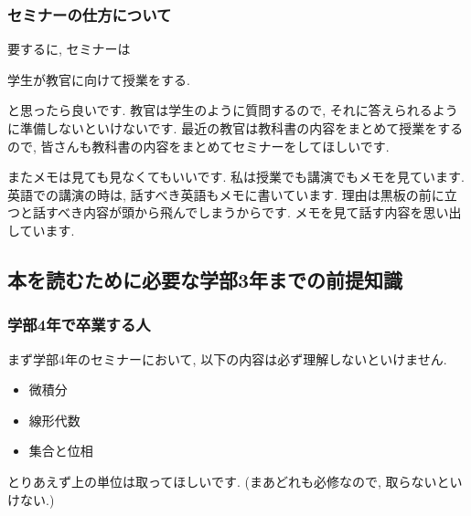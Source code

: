 \begin{comment}
最後になぜこんなことを言うかといいますと, 無責任に「河東先生のセミナーの準備の仕方について」のページを教える人が多いと思ったからです.
この方法を教える人には
\begin{tcolorbox}[mybox]
\begin{center}
そう言うあなたは講演や授業で, 河東先生のように準備ができていますか?
\end{center}
\end{tcolorbox}
と問いたいです. 

河東先生はできるんです. YouTubeで河東先生の授業を見たが本当にできています. すごいとしか言えません. 
私には到底できないので, 上の方法(河東先生のセミナーの準備の方法)を押し付ける気は全くないです. 
\end{comment}
\subsubsection{セミナーの仕方について}

要するに, セミナーは
\begin{tcolorbox}[mybox]
\begin{center}
学生が教官に向けて授業をする.
\end{center}
\end{tcolorbox}
と思ったら良いです.  
教官は学生のように質問するので, それに答えられるように準備しないといけないです. 
最近の教官は教科書の内容をまとめて授業をするので, 皆さんも教科書の内容をまとめてセミナーをしてほしいです. 

またメモは見ても見なくてもいいです. 私は授業でも講演でもメモを見ています. 英語での講演の時は, 話すべき英語もメモに書いています. 
理由は黒板の前に立つと話すべき内容が頭から飛んでしまうからです. メモを見て話す内容を思い出しています. 

\subsection{本を読むために必要な学部3年までの前提知識}
\label{subsec-class}

\subsubsection{学部4年で卒業する人}
まず学部4年のセミナーにおいて, 以下の内容は必ず理解しないといけません. 
\vspace{-8pt}
\begin{itemize}[left=0pt]
  \setlength{\parskip}{0cm} %
  \setlength{\itemsep}{0cm} %
  \item 微積分
  \item 線形代数
 \item 集合と位相
\end{itemize}
とりあえず上の単位は取ってほしいです. (まあどれも必修なので, 取らないといけない.)

